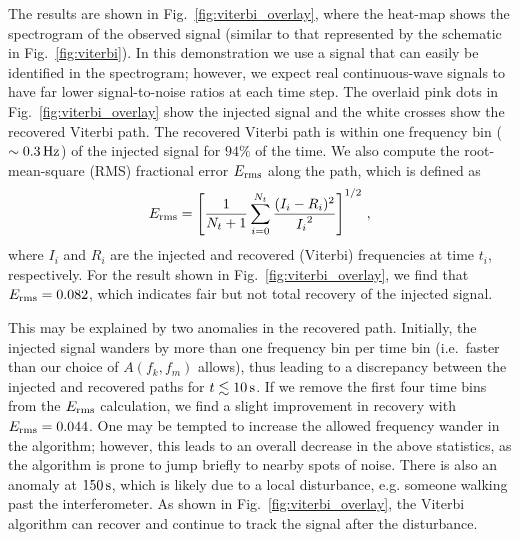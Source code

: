 \documentclass[paper-main.tex]{subfiles}
\begin{document}
The results are shown in Fig.~\ref{fig:viterbi_overlay}, where the heat-map shows the spectrogram of the observed signal (similar to that represented by the schematic in Fig.~\ref{fig:viterbi}). 
In this demonstration we use a signal that can easily be identified in the spectrogram; however, we expect real continuous-wave signals to have far lower signal-to-noise ratios at each time step. 
The overlaid pink dots in Fig.~\ref{fig:viterbi_overlay} show the injected signal and the white crosses show the recovered Viterbi path.
The recovered Viterbi path is within one frequency bin ($\sim 0.3\,{\rm Hz}$) of the injected signal for $94\%$ of the time. We also compute the root-mean-square (RMS) fractional error $E_{\rm rms}$ along the path, which is defined as 
\begin{equation}
E_{\rm rms} = \left[ \frac{1}{N_t+1} \sum_{i=0}^{N_t} \frac{(I_i - R_i)^2}{{I_i}^2} \right] ^{1/2}\,,
\end{equation}
where $I_i$ and $R_i$ are the injected and recovered (Viterbi) frequencies at time $t_i$, respectively. 
For the result shown in Fig.~\ref{fig:viterbi_overlay}, we find that $E_{\rm rms} = 0.082$, which indicates fair but not total recovery of the injected signal.


This may be explained by two anomalies in the recovered path. Initially, the injected signal wanders by more than one frequency bin per time bin (i.e.\ faster than our choice of $A(f_k,f_m)$ allows), thus leading to a discrepancy between the injected and recovered paths for $t\lesssim 10\,{\rm s}$. 
If we remove the first four time bins from the $E_{\rm rms}$ calculation, we find a slight improvement in recovery with $E_{\rm rms} = 0.044$.
One may be tempted to increase the allowed frequency wander in the algorithm; however, this leads to an overall decrease in the above statistics, as the algorithm is prone to jump briefly to nearby spots of noise. 
There is also an anomaly at $150\,{\rm s}$, which is likely due to a local disturbance, e.g. someone walking past the interferometer. 
As shown in Fig.~\ref{fig:viterbi_overlay}, the Viterbi algorithm can recover and continue to track the signal after the disturbance. 
\end{document}
